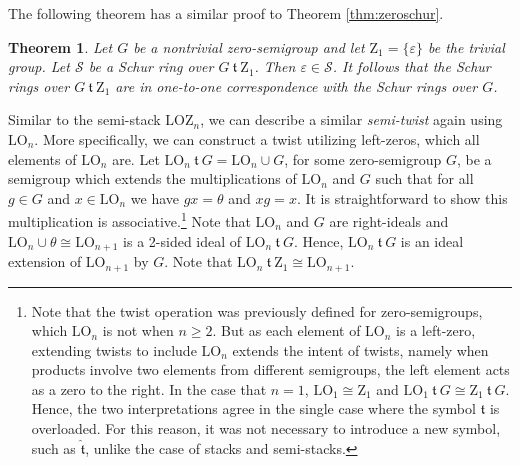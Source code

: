 \documentclass{article}
\theoremstyle{plain}
\newtheorem{Thm}{Theorem}[section]
\theoremstyle{definition}
\renewcommand{\S}{\mathcal{S}}
\newcommand{\LO}{\mathrm{LO}}
\newcommand{\LOZ}{\mathrm{LOZ}}
\newcommand{\z}{\mathrm{Z}}
\renewcommand{\t}{\ \mathfrak{t}\ }
\begin{document}
The following theorem has a similar proof to Theorem \ref{thm:zeroschur}.

\begin{Thm} Let $G$ be a nontrivial zero-semigroup and let $\z_1 = \{\varepsilon\}$ be the trivial group. Let $\S$ be a Schur ring over $G\t \z_1$. Then $\varepsilon\in \S$. It follows that the Schur rings over $G\t \z_1$ are in one-to-one correspondence with the Schur rings over $G$. 
\end{Thm}

Similar to the semi-stack $\LOZ_n$, we can describe a similar \emph{semi-twist} again using $\LO_n$. More specifically, we can construct a twist utilizing left-zeros, which all elements of $\LO_n$ are. Let \label{semitwist}$\LO_n \t G = \LO_n\cup G$, for some zero-semigroup $G$, be a semigroup which extends the multiplications of $\LO_n$ and $G$ such that for all $g\in G$ and $x\in \LO_n$ we have $gx=\theta$ and $xg=x$. It is straightforward to show this multiplication is associative.\footnote{Note that the twist operation was previously defined for zero-semigroups, which $\LO_n$ is not when $n\ge 2$. But as each element of $\LO_n$ is a left-zero, extending twists to include $\LO_n$ extends the intent of twists, namely when products involve two elements from different semigroups, the left element acts as a zero to the right. In the case that $n=1$, $\LO_1 \cong \z_1$ and $\LO_1 \t G\cong \z_1\t G$. Hence, the two interpretations agree in the single case where the symbol $\mathfrak{t}$ is overloaded. For this reason, it was not necessary to introduce a new symbol, such as $\hat{\mathfrak{t}}$, unlike the case of stacks and semi-stacks.} Note that $\LO_n$ and $G$ are right-ideals and $\LO_n\cup \theta \cong \LO_{n+1}$ is a 2-sided ideal of $\LO_n\t G$. Hence, $\LO_n \t G$ is an ideal extension of $\LO_{n+1}$ by $G$. Note that $\LO_n \t \z_1\cong \LO_{n+1}$.
\end{document}
